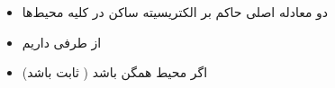 \ELhold


\begin{ELunit}

\begin{itemize}
\tightlist
\item
  دو معادله اصلی حاکم بر الکتریسیته ساکن در کلیه محیط‌ها
\end{itemize}


\begin{itemize}
\tightlist
\item
  از طرفی داریم
\end{itemize}


\end{ELunit}

\begin{ELjoin}

\begin{itemize}
\tightlist
\item
  اگر محیط همگن باشد (\ELim{\epsilon} ثابت باشد)
\end{itemize}

\begin{ELimportant}{}


\end{ELimportant}

\end{ELjoin}

